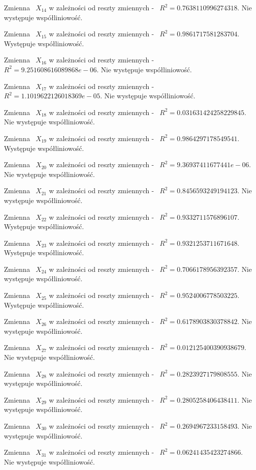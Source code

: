 \documentclass{article}
\begin{document}
Zmienna ~$X_{14}$ w zależności od reszty zmiennych - ~$R^2 = 0.7638110996274318$.
Nie występuje współliniowość.

Zmienna ~$X_{15}$ w zależności od reszty zmiennych - ~$R^2 = 0.9861717581283704$.
Występuje współliniowość.

Zmienna ~$X_{16}$ w zależności od reszty zmiennych - ~$R^2 = 9.251608616089868e-06$.
Nie występuje współliniowość.

Zmienna ~$X_{17}$ w zależności od reszty zmiennych - ~$R^2 = 1.1019622126018369e-05$.
Nie występuje współliniowość.

Zmienna ~$X_{18}$ w zależności od reszty zmiennych - ~$R^2 = 0.031631424258229845$.
Nie występuje współliniowość.

Zmienna ~$X_{19}$ w zależności od reszty zmiennych - ~$R^2 = 0.9864297178549541$.
Występuje współliniowość.

Zmienna ~$X_{20}$ w zależności od reszty zmiennych - ~$R^2 = 9.36937411677441e-06$.
Nie występuje współliniowość.

Zmienna ~$X_{21}$ w zależności od reszty zmiennych - ~$R^2 = 0.8456593249194123$.
Nie występuje współliniowość.

Zmienna ~$X_{22}$ w zależności od reszty zmiennych - ~$R^2 = 0.9332711576896107$.
Występuje współliniowość.

Zmienna ~$X_{23}$ w zależności od reszty zmiennych - ~$R^2 = 0.9321253711671648$.
Występuje współliniowość.

Zmienna ~$X_{24}$ w zależności od reszty zmiennych - ~$R^2 = 0.7066178956392357$.
Nie występuje współliniowość.

Zmienna ~$X_{25}$ w zależności od reszty zmiennych - ~$R^2 = 0.9524006778503225$.
Występuje współliniowość.

Zmienna ~$X_{26}$ w zależności od reszty zmiennych - ~$R^2 = 0.6178903830378842$.
Nie występuje współliniowość.

Zmienna ~$X_{27}$ w zależności od reszty zmiennych - ~$R^2 = 0.012125400390938679$.
Nie występuje współliniowość.

Zmienna ~$X_{28}$ w zależności od reszty zmiennych - ~$R^2 = 0.2823927179808555$.
Nie występuje współliniowość.

Zmienna ~$X_{29}$ w zależności od reszty zmiennych - ~$R^2 = 0.2805258406438411$.
Nie występuje współliniowość.

Zmienna ~$X_{30}$ w zależności od reszty zmiennych - ~$R^2 = 0.2694967233158493$.
Nie występuje współliniowość.

Zmienna ~$X_{31}$ w zależności od reszty zmiennych - ~$R^2 = 0.06241435423274866$.
Nie występuje współliniowość.
\end{document}
